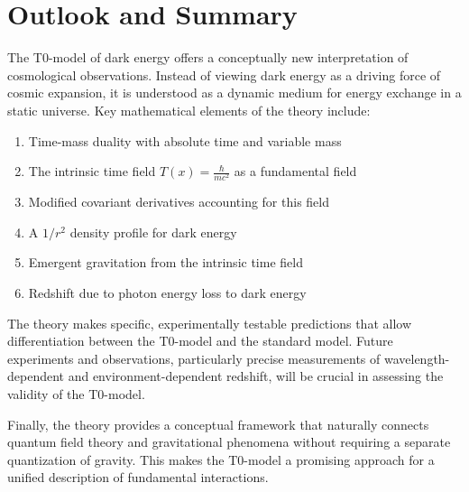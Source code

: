 \documentclass[a4paper,12pt]{article}
\theoremstyle{definition}
\theoremstyle{remark}
\newcommand{\Tfield}{T(x)} %
\begin{document}
	\section{Outlook and Summary}
	
	The T0-model of dark energy offers a conceptually new interpretation of cosmological observations. Instead of viewing dark energy as a driving force of cosmic expansion, it is understood as a dynamic medium for energy exchange in a static universe. Key mathematical elements of the theory include:
	
	\begin{enumerate}
		\item Time-mass duality with absolute time and variable mass
		\item The intrinsic time field \(\Tfield = \frac{\hbar}{mc^2}\) as a fundamental field
		\item Modified covariant derivatives accounting for this field
		\item A \(1/r^2\) density profile for dark energy
		\item Emergent gravitation from the intrinsic time field
		\item Redshift due to photon energy loss to dark energy
	\end{enumerate}
	
	The theory makes specific, experimentally testable predictions that allow differentiation between the T0-model and the standard model. Future experiments and observations, particularly precise measurements of wavelength-dependent and environment-dependent redshift, will be crucial in assessing the validity of the T0-model.
	
	Finally, the theory provides a conceptual framework that naturally connects quantum field theory and gravitational phenomena without requiring a separate quantization of gravity. This makes the T0-model a promising approach for a unified description of fundamental interactions.
	
\end{document}
